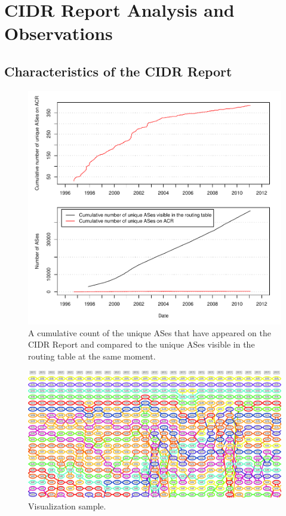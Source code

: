 \chapter{CIDR Report Analysis and Observations}
\label{chap:analysis}

\section{Characteristics of the CIDR Report}

\begin{figure}
    \includegraphics[width=6in]{figures/cumulative_asn_counts.pdf}
    \caption{A cumulative count of the unique ASes that have appeared on the CIDR Report and compared to the unique ASes visible in the routing table at the same moment.}
\end{figure}

\begin{figure}
    \includegraphics[width=6in]{figures/viz_sample.jpg}
    \caption{Visualization sample.}
\end{figure}

